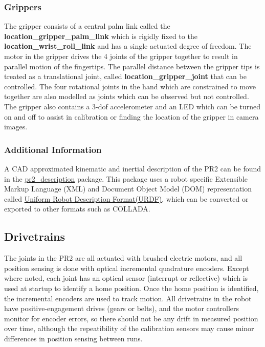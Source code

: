 \subsubsection{Grippers}
The gripper consists of a central palm link called the {\bf
  location\_gripper\_palm\_link} which is rigidly fixed to the {\bf
  location\_wrist\_roll\_link} and has a single actuated degree of freedom.  The
motor in the gripper drives the 4 joints of the gripper together to result in
parallel motion of the fingertips.  The parallel distance between the gripper
tips is treated as a translational joint, called {\bf location\_gripper\_joint}
that can be controlled.  The four rotational joints in the hand which are
constrained to move together are also modelled as joints which can be observed
but not controlled.  The gripper also contains a 3-dof accelerometer and an LED
which can be turned on and off to assist in calibration or finding the location
of the gripper in camera images.

\subsubsection{Additional Information}
A CAD approximated kinematic and inertial description of the PR2 can be found in
the \href{http://www.ros.org/wiki/pr2\_description}{pr2\_description} package.
This package uses a robot specific Extensible Markup Language (XML) and Document
Object Model (DOM) representation called
\href{http://www.ros.org/wiki/urdf}{Uniform Robot Description Format(URDF)}, which can
be converted or exported to other formats such as COLLADA.


\subsection{Drivetrains}
The joints in the PR2 are all actuated with brushed electric motors, and all
position sensing is done with optical incremental quadrature encoders.  Except
where noted, each joint has an optical sensor (interrupt or reflective) which is
used at startup to identify a home position.  Once the home position is
identified, the incremental encoders are used to track motion.  All drivetrains
in the robot have positive-engagement drives (gears or belts), and the motor
controllers monitor for encoder errors, so there should not be any drift in
measured position over time, although the repeatibility of the calibration
sensors may cause minor differences in position sensing between runs.

